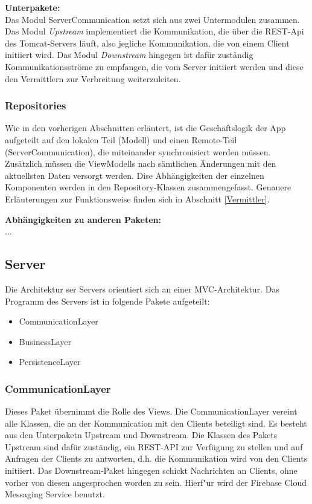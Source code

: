 \documentclass[11pt,a4paper]{report}
\begin{document}
\textbf{Unterpakete:}\\
Das Modul ServerCommunication setzt sich aus zwei Untermodulen zusammen. Das Modul \textit{Upstream} implementiert die Kommunikation, die über die REST-Api des Tomcat-Servers läuft, also jegliche Kommunikation, die von einem Client initiiert wird. Das Modul \textit{Downstream} hingegen ist dafür zuständig Kommunikationsströme zu empfangen, die vom Server initiiert werden und diese den Vermittlern zur Verbreitung weiterzuleiten.

\subsubsection{Repositories}
Wie in den vorherigen Abschnitten erläutert, ist die Geschäftslogik der App aufgeteilt auf den lokalen Teil (Modell) und einen Remote-Teil (ServerCommunication), die miteinander synchronisiert werden müssen. Zusätzlich müssen die ViewModells nach sämtlichen Änderungen mit den aktuellsten Daten versorgt werden. Dise Abhängigkeiten der einzelnen Komponenten werden in den Repository-Klassen zusammengefasst. Genauere Erläuterungen zur Funktionsweise finden sich in Abschnitt \ref{Vermittler}.

\textbf{Abhängigkeiten zu anderen Paketen:}\\
...

\subsection{Server}
Die Architektur ser Servers orientiert sich an einer MVC-Architektur. Das Programm des Servers ist in folgende Pakete aufgeteilt:
\begin{itemize}
	\item CommunicationLayer
	\item BusinessLayer
	\item PersistenceLayer
\end{itemize}

\subsubsection{CommunicationLayer}
Dieses Paket übernimmt die Rolle des Views. Die CommunicationLayer vereint alle Klassen, die an der Kommunication mit den Clients beteiligt sind. Es besteht aus den Unterpaketn Upstream und Downstream. Die Klassen des Pakets Upstream sind dafür zuständig, ein REST-API zur Verfügung zu stellen und auf Anfragen der Clients zu antworten, d.h. die Kommunikation wird von den Clients initiiert. Das Downstream-Paket hingegen schickt Nachrichten an Clients, ohne vorher von diesen angesprochen worden zu sein. Hierf"ur wird der Firebase Cloud Messaging Service benutzt.
\end{document}
